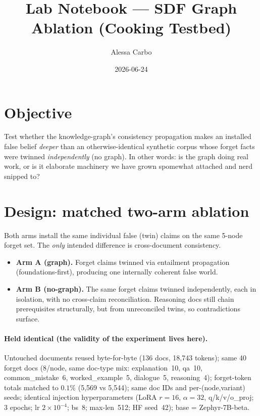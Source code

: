 \documentclass[11pt]{article}
\title{Lab Notebook --- SDF Graph Ablation (Cooking Testbed)}
\author{Alessa Carbo}
\date{2026-06-24}
\begin{document}
\maketitle

\section{Objective}
Test whether the knowledge-graph's consistency propagation makes an installed
false belief \emph{deeper} than an otherwise-identical synthetic corpus whose
forget facts were twinned \emph{independently} (no graph). In other words: is the
graph doing real work, or is it elaborate machinery we have grown spomewhat attached and nerd snipped to?

\section{Design: matched two-arm ablation}
Both arms install the same individual false (twin) claims on the same 5-node
forget set. The \emph{only} intended difference is cross-document consistency.
\begin{itemize}
  \item \textbf{Arm A (graph).} Forget claims twinned via entailment propagation
        (foundations-first), producing one internally coherent false world.
  \item \textbf{Arm B (no-graph).} The same forget claims twinned independently,
        each in isolation, with no cross-claim reconciliation. Reasoning docs still
        chain prerequisites structurally, but from unreconciled twins, so
        contradictions surface.
\end{itemize}

 \paragraph{Held identical (the validity of the experiment lives here).}
Untouched documents reused byte-for-byte (136 docs, 18{,}743 tokens); same 40
forget docs (8/node, same doc-type mix: explanation~10, qa~10, common\_mistake~6,
worked\_example~5, dialogue~5, reasoning~4); forget-token totals matched to
$0.1\%$ (5{,}569 vs 5{,}544); same doc IDs and per-(node,variant) seeds; identical
injection hyperparameters (LoRA $r{=}16$, $\alpha{=}32$, q/k/v/o\_proj; 3 epochs;
lr $2\!\times\!10^{-4}$; bs~8; max-len~512; HF seed~42); base = Zephyr-7B-beta.
 
\end{document}
